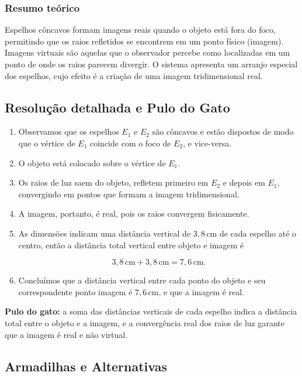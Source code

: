 \documentclass{article}
\begin{document}
\subsubsection*{Resumo teórico}

Espelhos côncavos formam imagens reais quando o objeto está fora do foco, permitindo que os raios refletidos se encontrem em um ponto físico (imagem). Imagens virtuais são aquelas que o observador percebe como localizadas em um ponto de onde os raios parecem divergir. O sistema apresenta um arranjo especial dos espelhos, cujo efeito é a criação de uma imagem tridimensional real.

\subsection*{Resolução detalhada e Pulo do Gato}

\begin{enumerate}
  \item Observamos que os espelhos $E_1$ e $E_2$ são côncavos e estão dispostos de modo que o vértice de $E_1$ coincide com o foco de $E_2$, e vice-versa.
  \item O objeto está colocado sobre o vértice de $E_1$.
  \item Os raios de luz saem do objeto, refletem primeiro em $E_2$ e depois em $E_1$, convergindo em pontos que formam a imagem tridimensional.
  \item A imagem, portanto, é real, pois os raios convergem fisicamente.
  \item As dimensões indicam uma distância vertical de $3,8\,\mathrm{cm}$ de cada espelho até o centro, então a distância total vertical entre objeto e imagem é

  \[
  3{,}8\,\mathrm{cm} + 3{,}8\,\mathrm{cm} = 7{,}6\,\mathrm{cm}.
  \]

  \item Concluímos que a distância vertical entre cada ponto do objeto e seu correspondente ponto imagem é $7,6\,\mathrm{cm}$, e que a imagem é real.
\end{enumerate}

\textbf{Pulo do gato:} a soma das distâncias verticais de cada espelho indica a distância total entre o objeto e a imagem, e a convergência real dos raios de luz garante que a imagem é real e não virtual.

\subsection*{Armadilhas e Alternativas}
\end{document}
